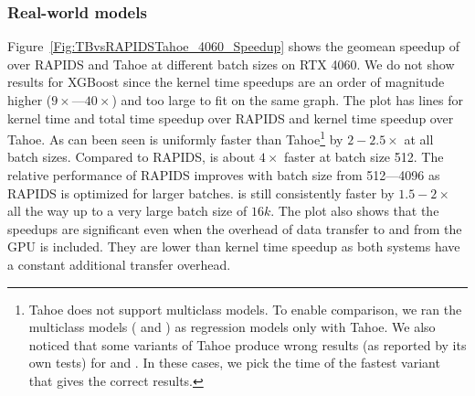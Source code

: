 \subsubsection*{Real-world models}
Figure~\ref{Fig:TBvsRAPIDSTahoe_4060_Speedup} shows the geomean speedup of \Treebeard{} over RAPIDS and Tahoe at different batch sizes on RTX 4060. 
We do not show results for XGBoost since the kernel time speedups are an order of magnitude higher ($9\times$---$40\times$) and too large to fit on the same graph.  
The plot has lines for kernel time and total time speedup over RAPIDS and kernel time speedup over Tahoe. As can been seen 
\Treebeard{} is uniformly faster than Tahoe{\footnote{Tahoe does not support multiclass models. To enable comparison, we ran 
the multiclass models ( and ) as regression models only with Tahoe. We also noticed that some variants
of Tahoe produce wrong results (as reported by its own tests) for  and . In these cases, we pick the 
time of the fastest variant that gives the correct results.}} by $2-2.5\times$ at all batch sizes. 
Compared to RAPIDS, \Treebeard{} is about $4\times$ faster at batch size 512. The relative performance of RAPIDS improves 
with batch size from 512---4096 as RAPIDS is optimized for larger batches. \Treebeard{} is still consistently faster by $1.5-2\times$ all the way up to a very large batch size of $16k$. 
The plot also shows that the speedups are significant even when the overhead of data transfer to and from the GPU
is included. They are lower than kernel time speedup as both systems have a constant additional transfer overhead.

